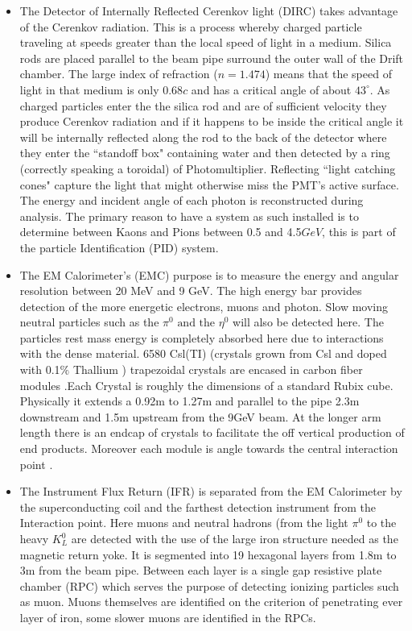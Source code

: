 \begin{itemize}
\item The Detector of Internally Reflected Cerenkov light (DIRC) takes advantage of the Cerenkov radiation. This is a process whereby charged particle traveling at speeds greater than the local speed of light in a medium. Silica rods are placed parallel to the beam pipe surround the outer wall of the Drift chamber. The large index of refraction ($n= 1.474$) means that the speed of light in that medium is only $0.68c$ and has a critical angle of about $43^{\circ}$. As charged particles enter the the silica rod and are of sufficient velocity they produce Cerenkov radiation and if it happens to be inside the critical angle it will be internally reflected along the rod to the back of the detector where they enter the ``standoff box" containing water and then detected by a ring (correctly speaking a toroidal) of Photomultiplier. Reflecting ``light catching cones" capture the light that might otherwise miss the PMT's active surface.  The energy and incident angle of each photon is reconstructed during analysis. The primary reason to have a system as such installed is to determine between Kaons and Pions between 0.5 and 4.5$GeV$, this is part of the particle Identification (PID) system. 


\item The EM Calorimeter's (EMC) purpose is to measure the energy and angular resolution between 20 MeV and 9 GeV. The high energy bar provides detection of the more energetic electrons, muons and photon. Slow moving neutral particles such as the $\pi^0 \mbox{ and the } \eta^0$ will also be detected here. The particles rest mass energy is completely absorbed here due to interactions with the dense material. 6580 Csl(TI) (crystals grown from Csl and doped with 0.1$\%$ Thallium ) trapezoidal crystals are encased in carbon fiber modules .Each Crystal is roughly the dimensions of a standard Rubix cube. Physically it extends a 0.92m to 1.27m and parallel to the pipe 2.3m downstream and 1.5m upstream from the 9GeV beam. At the longer arm length there is an endcap of crystals to facilitate the off vertical production of end products. Moreover each module is angle towards the central interaction point \cite{B15}.

\item The Instrument Flux Return (IFR) is separated from the EM Calorimeter by the superconducting coil and the farthest detection instrument from the Interaction point. Here muons and neutral hadrons (from the light $\pi^0$ to the heavy $K^{0}_{L}$ are detected with the use of the large iron structure needed as the magnetic return yoke. It is segmented into 19 hexagonal layers from 1.8m to 3m from the beam pipe. Between each layer is a single gap resistive plate chamber (RPC) which serves the purpose of detecting ionizing particles such as muon. Muons themselves are identified on the criterion of penetrating ever layer of iron, some slower muons are identified in the RPCs. 
\end{itemize}
